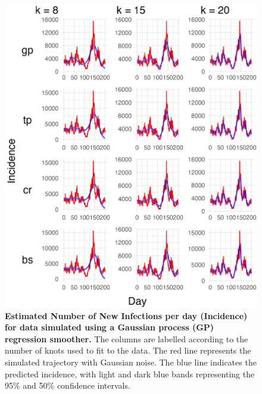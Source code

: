 \documentclass[
11pt, %
oneside, %
english, %
singlespacing, %
]{macthesis} %
\begin{document}
\begin{figure}[H]
\centering
\includegraphics[width=\textwidth]{figure/Simulated/unaggregated/simulation_gp_20_k(5,10,20)_bsd1_beta1_plot_incidence.png}
\caption[Predicted Simulated Data (GP) Incidence]{\textbf{Estimated Number of New Infections per day (Incidence) for data simulated using a Gaussian process (GP) regression smoother.} The columns are labelled according to the number of knots used to fit to the data. The red line represents the simulated trajectory with Gaussian noise. The blue line indicates the predicted incidence, with light and dark blue bands representing the 95\% and 50\% confidence intervals.}
\label{fig:incidence20gp}
\end{figure}
\end{document}
